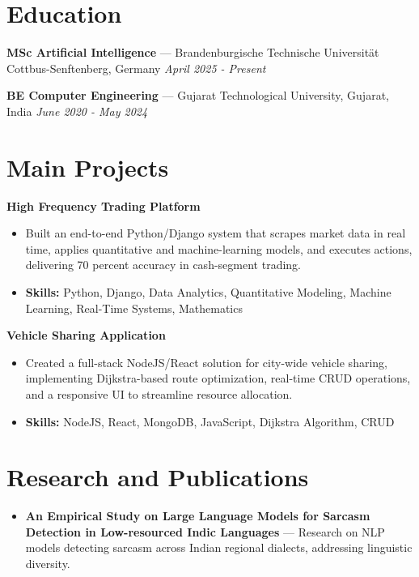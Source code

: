 \documentclass[a4paper,10pt]{article}
\begin{document}
\section*{Education}
\textbf{MSc Artificial Intelligence} — Brandenburgische Technische Universität Cottbus-Senftenberg, Germany \hfill \textit{April 2025 - Present}\par
\vspace{1.5pt}
\textbf{BE Computer Engineering} — Gujarat Technological University, Gujarat, India \hfill \textit{June 2020 - May 2024}\par

\section*{Main Projects}
\textbf{High Frequency Trading Platform}\par
\vspace{1pt}
\begin{itemize}
  \item Built an end-to-end Python/Django system that scrapes market data in real time, applies quantitative and machine-learning models, and executes actions, delivering 70 percent accuracy in cash-segment trading.
  \item \textbf{Skills:} Python, Django, Data Analytics, Quantitative Modeling, Machine Learning, Real-Time Systems, Mathematics
\end{itemize}
\vspace{3pt}
\textbf{Vehicle Sharing Application}\par
\vspace{1pt}
\begin{itemize}
  \item Created a full-stack NodeJS/React solution for city-wide vehicle sharing, implementing Dijkstra-based route optimization, real-time CRUD operations, and a responsive UI to streamline resource allocation.
  \item \textbf{Skills:} NodeJS, React, MongoDB, JavaScript, Dijkstra Algorithm, CRUD
\end{itemize}

\section*{Research and Publications}
\begin{itemize}
\item \textbf{An Empirical Study on Large Language Models for Sarcasm Detection in Low-resourced Indic Languages} — Research on NLP models detecting sarcasm across Indian regional dialects, addressing linguistic diversity.
\end{itemize}
\end{document}

